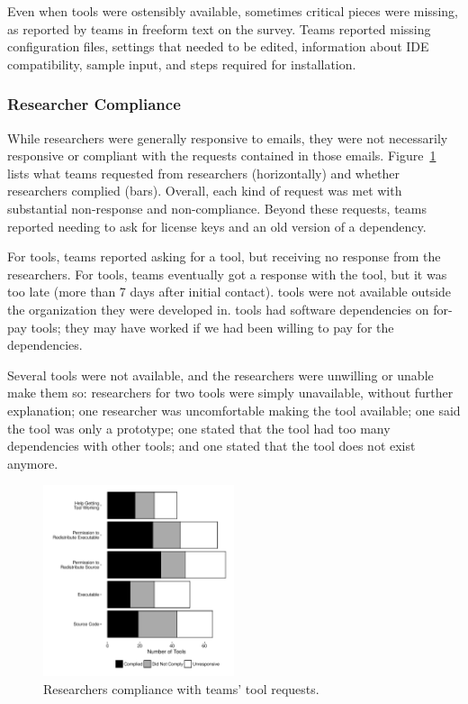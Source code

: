 \documentclass[10pt,conference]{IEEEtran}
\begin{document}
Even when tools were ostensibly available,
sometimes critical pieces were missing,
as reported by teams in freeform text on the survey.
Teams reported missing configuration files,
settings that needed to be edited, 
information about IDE compatibility,
sample input,
and steps required for installation. 

\subsubsection{Researcher Compliance}

While researchers were generally responsive to emails,
they were not necessarily responsive or compliant 
with the requests contained in those emails.
Figure~\ref{fig:requests} lists what teams requested from researchers
(horizontally) and whether researchers complied (bars).
Overall, each kind of request was met with substantial non-response and
non-compliance.
Beyond these requests, teams reported needing to ask for 
license keys and
an old version of a dependency.

For \unworkNoResponseToAsk tools, teams reported asking for a tool,
but receiving no response from the researchers.
For \unworkTooLate tools, teams eventually got a response with the tool, 
but it was  too late (more than 7 days after initial contact).
\unworkInternal tools were not available outside the organization
they were developed in.
\unworkPay tools had software dependencies on for-pay tools; 
they may have worked if we had been willing to pay 
for the dependencies.

Several tools were not available, 
and the researchers were unwilling or unable make them so:
researchers for two tools were simply unavailable,
without further explanation; 
one researcher was uncomfortable making the tool available;
one said the tool was only a prototype;
one stated that the tool had too many dependencies with other tools;
and one stated that the tool does not exist anymore.

\begin{figure}[!t]
  \centering
    \includegraphics[width=0.5\textwidth]{requestPlot.pdf}
  \caption{Researchers compliance with teams' tool requests.}\label{fig:requests}
\end{figure}
\end{document}
